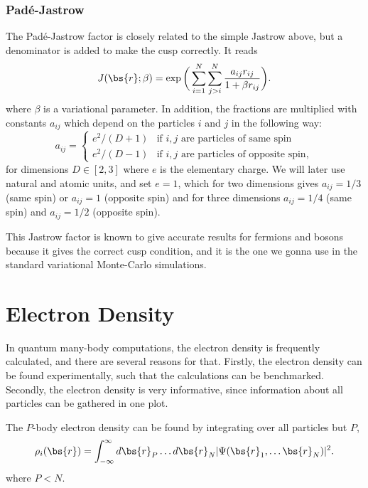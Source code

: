 \subsubsection{Padé-Jastrow}
The Padé-Jastrow factor is closely related to the simple Jastrow above, but a denominator is added to make the cusp correctly. It reads
\begin{equation}
J(\bs{r};\beta) = \exp\bigg(\sum_{i=1}^N\sum_{j>i}^N\frac{a_{ij}r_{ij}}{1+\beta r_{ij}}\bigg).
\label{eq:PadeJastrow}
\end{equation}
where $\beta$ is a variational parameter. In addition, the fractions are multiplied with constants $a_{ij}$ which depend on the particles $i$ and $j$ in the following way:
\begin{equation}
\label{eq:ajastrow}
a_{ij}=
\begin{cases} 
e^2/(D+1) & \text{if $i,j$ are particles of same spin} \\
e^2/(D-1) & \text{if $i,j$ are particles of opposite spin},
\end{cases}
\end{equation}
for dimensions $D\in[2,3]$ where $e$ is the elementary charge. We will later use natural and atomic units, and set $e=1$, which for two dimensions gives $a_{ij}=1/3$ (same spin) or $a_{ij}=1$ (opposite spin) and for three dimensions $a_{ij}=1/4$ (same spin) and $a_{ij}=1/2$ (opposite spin).

This Jastrow factor is known to give accurate results for fermions and bosons because it gives the correct cusp condition, and it is the one we gonna use in the standard variational Monte-Carlo simulations.

\section{Electron Density}
In quantum many-body computations, the electron density is frequently calculated, and there are several reasons for that. Firstly, the electron density can be found experimentally, such that the calculations can be benchmarked. Secondly, the electron density is very informative, since information about all particles can be gathered in one plot.

The $P$-body electron density can be found by integrating over all particles but $P$, 
\begin{equation}
\label{eq:electron_density}
\rho_i(\bs{r})=\int_{-\infty}^{\infty}d\bs{r}_P\hdots d\bs{r}_N |\Psi(\bs{r}_1,\hdots \bs{r}_N)|^2.
\end{equation}
where $P<N$.


